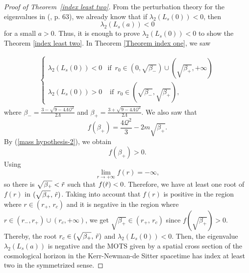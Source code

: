 \documentclass[a4paper, 11pt, reqno]{amsart}
\begin{document}
 \begin{proof}[Proof of Theorem~\ref{index least two}]
From the perturbation theory for the eigenvalues in (\cite{K}, p. 63), we already know that if $\lambda_2(L_s(0))<0$, then
$$\lambda_2(L_s(a))<0$$
for a small $a>0$. Thus, it is enough to prove $\lambda_2(L_s(0))<0$ to show the Theorem \ref{index least two}. In Theorem \ref{Theorem index one}, we saw 

 \begin{eqnarray*}
\left\{\begin{array}{rc}
\lambda_2(L_s(0))<0 &\mbox{if}\,\,\,r_0\in (0,\sqrt{\beta_{-}})\cup(\sqrt{\beta_{+}},+\infty)\\
\lambda_{2}(L_s(0))>0  &\mbox{ if}\,\,\,r_0\in (\sqrt{\beta_{-}},\sqrt{\beta_{+}}),
\end{array}\right.
\end{eqnarray*}
where $\beta_{-}=\frac{3-\sqrt{9-4\Lambda\mathcal{Q}^2}}{2\Lambda}$ and $\beta_{+}=\frac{3+\sqrt{9-4\Lambda\mathcal{Q}^2}}{2\Lambda}$. We also saw that
\begin{equation*}
    f(\beta_{+})=\frac{4\mathcal{Q}^2}{3}-2m\sqrt{\beta_{+}}.
\end{equation*}
By (\ref{mass hypothesis-2}), we obtain
     \begin{equation*}
    f(\beta_{+})>0.
\end{equation*}
Using
$$\lim\limits_{r \to {+\infty}}f(r)=-\infty,$$
so there is $\sqrt{\beta_+}<\Tilde{r}$ such that $f(\Tilde{r})<0$. Therefore, we have at least one root of $f(r)$ in $(\sqrt{\beta_{+}},\, \Tilde{r})$. Taking into account that $f(r)$ is positive in the region where $r\in (r_{+},\,r_c)$ and it is negative in the region where $r\in(r_{-},r_{+})\cup(r_c,+\infty)$, we get $\sqrt{\beta_{+}}\in (r_{+},\,r_c)$ since $f(\sqrt{\beta_{+}})>0$. Thereby, the root $r_c\in(\sqrt{\beta_{+}},\,\Tilde{r})$ and $\lambda_2(L_s(0))<0$. Then, the eigenvalue $\lambda_2(L_s(a))$ is negative and the MOTS given by a spatial cross section of the cosmological horizon in the Kerr-Newman-de Sitter spacetime has index at least two in
the symmetrized sense.
 \end{proof}
\end{document}
